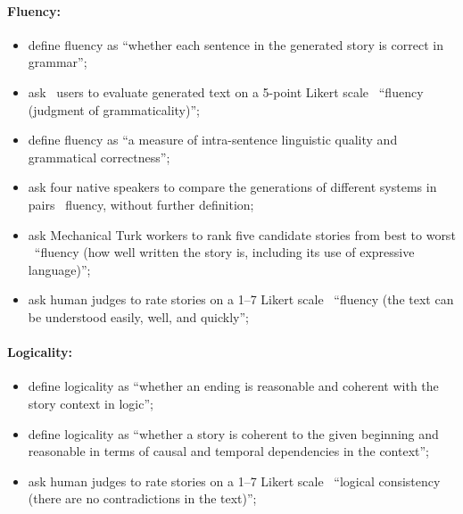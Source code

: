 \paragraph{Fluency:}
\begin{itemize}[nolistsep]
    \item \citet{xu-etal-2018-skeleton} define fluency as ``whether each
sentence in the generated story is correct in grammar'';
    \item \citet{akoury2020storium} ask \storium\ users to evaluate generated text on a 5-point Likert scale \wrt\ ``fluency (judgment of grammaticality)'';
    \item \citet{guan2021long} define fluency as ``a measure of intra-sentence linguistic quality and grammatical correctness'';
    \item \citet{bai2021semantics} ask four native speakers to compare the generations of different systems in pairs \wrt\ fluency, without further definition;
    \item \citet{wilmot2021temporal} ask Mechanical Turk workers to rank five candidate stories from best to worst \wrt\ ``fluency (how well written the story is, including its use of expressive language)'';
    \item \citet{pascual-etal-2021-plug-play} ask human judges to rate stories on a 1--7 Likert scale \wrt\ ``fluency (the text can be understood easily, well, and quickly'';
\end{itemize}

\paragraph{Logicality:}
\begin{itemize}[nolistsep]
    \item \citet{guan2019story} define logicality as ``whether an ending is reasonable and coherent with the story context in logic'';
    \item \citet{guan-etal-2020-knowledge} define logicality as ``whether a story is coherent to the given beginning and reasonable in terms of causal and temporal dependencies in the context'';
    \item \citet{pascual-etal-2021-plug-play} ask human judges to rate stories on a 1--7 Likert scale \wrt\ ``logical consistency (there are no contradictions in the text)'';
\end{itemize}

